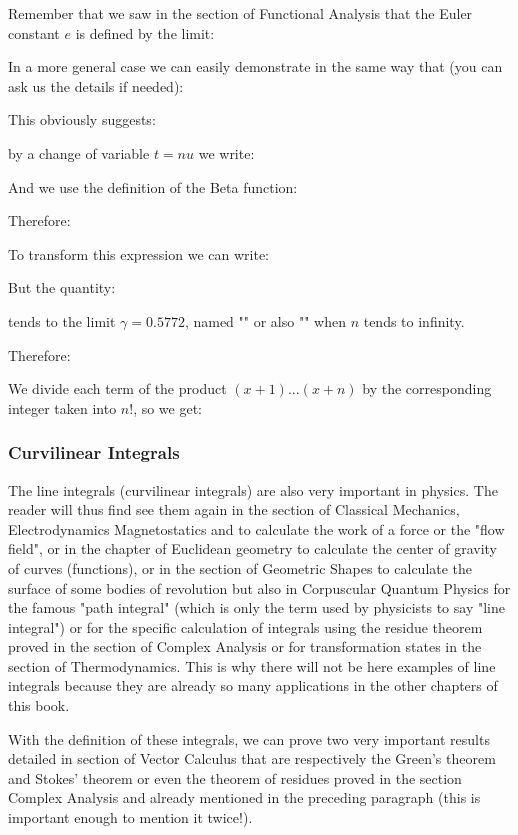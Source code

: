 	Remember that we saw in the section of Functional Analysis that the Euler constant $e$ is defined by the limit:
	
	
	In a more general case we can easily demonstrate in the same way that (you can ask us the details if needed):	
	
	This obviously suggests:
	
	by a change of variable $t=nu$ we write:
	
	And we use the definition of the Beta function:
	
	Therefore:
	
	To transform this expression we can write:
	
	But the quantity:
	
	tends to the limit $\gamma=0.5772$, named "" or also "" when $n$ tends to infinity.
	
	Therefore:
	
	We divide each term of the product $(x+1)...(x+n)$ by the corresponding integer taken into $n!$, so we get:
	
	
	\pagebreak
	\subsubsection{Curvilinear Integrals}
	The line integrals (curvilinear integrals) are also very important in physics. The reader will thus find see them again in the section of Classical Mechanics, Electrodynamics Magnetostatics and to calculate the work of a force or the "flow field", or in the chapter of Euclidean geometry to calculate the center of gravity of curves (functions), or in the section of Geometric Shapes to calculate the surface of some bodies of revolution but also in Corpuscular Quantum Physics for the famous "path integral" (which is only the term used by physicists to say "line integral") or for the specific calculation of integrals using the residue theorem proved in the section of Complex Analysis or for transformation states in the section of Thermodynamics. This is why there will not be here examples of line integrals because they are already so many applications in the other chapters of this book.
	
	With the definition of these integrals, we can prove two very important results detailed in section of Vector Calculus that are respectively the Green's theorem and Stokes' theorem or even the theorem of residues proved in the section Complex Analysis and already mentioned in the preceding paragraph (this is important enough to mention it twice!).
	
